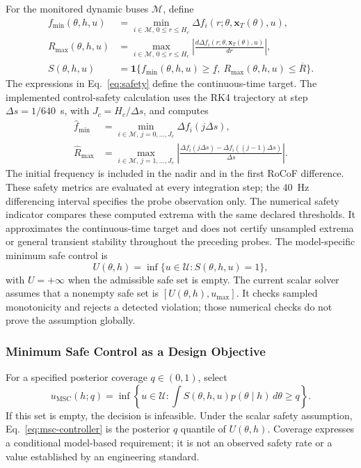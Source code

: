 \documentclass[journal]{IEEEtran}
\begin{document}
For the monitored dynamic buses $\mathcal M$, define
\begin{align}
f_{\min}(\theta,h,u)&=\min_{i\in\mathcal M,\,0\le r\le H_c}
\Delta f_i(r;\theta,\mathbf x_T(\theta),u),\\
R_{\max}(\theta,h,u)&=\max_{i\in\mathcal M,\,0\le r\le H_c}
\left|\frac{d\Delta f_i(r;\theta,\mathbf x_T(\theta),u)}{dr}\right|,\\
S(\theta,h,u)&=\mathbf1\{f_{\min}(\theta,h,u)\ge\underline f,
\ R_{\max}(\theta,h,u)\le\overline R\}.
\label{eq:safety}
\end{align}
The expressions in Eq.~\eqref{eq:safety} define the continuous-time target.
The implemented control-safety calculation uses the RK4 trajectory at step
$\Delta s=1/640$~s, with $J_c=H_c/\Delta s$, and computes
\begin{align}
\widehat f_{\min}&=\min_{i\in\mathcal M,\,j=0,\ldots,J_c}
\Delta f_i(j\Delta s),\\
\widehat R_{\max}&=\max_{i\in\mathcal M,\,j=1,\ldots,J_c}
\left|\frac{\Delta f_i(j\Delta s)-\Delta f_i((j-1)\Delta s)}{\Delta s}\right|.
\label{eq:discrete-control-safety}
\end{align}
The initial frequency is included in the nadir and in the first RoCoF
difference. These safety metrics are evaluated at every integration step;
the 40~Hz differencing interval specifies the probe observation only.
The numerical safety indicator compares these computed extrema with the
same declared thresholds. It approximates the continuous-time target and
does not certify unsampled extrema or general transient stability throughout
the preceding probes.
The model-specific minimum safe control is
\begin{equation}
U(\theta,h)=\inf\{u\in\mathcal U:S(\theta,h,u)=1\},
\label{eq:oracle}
\end{equation}
with $U=+\infty$ when the admissible safe set is empty.
The current scalar solver assumes that a nonempty safe set is
$[U(\theta,h),u_{\max}]$. It checks sampled monotonicity and rejects a detected
violation; those numerical checks do not prove the assumption globally.

\subsubsection{Minimum Safe Control as a Design Objective}
For a specified posterior coverage $q\in(0,1)$, select
\begin{equation}
u_{\mathrm{MSC}}(h;q)=\inf\left\{u\in\mathcal U:
\int S(\theta,h,u)p(\theta\mid h)\,d\theta\ge q\right\}.
\label{eq:msc-controller}
\end{equation}
If this set is empty, the decision is infeasible. Under the scalar safety
assumption, Eq.~\eqref{eq:msc-controller} is the posterior $q$ quantile of
$U(\theta,h)$. Coverage expresses a conditional model-based requirement;
it is not an observed safety rate or a value established by an engineering standard.
\end{document}
